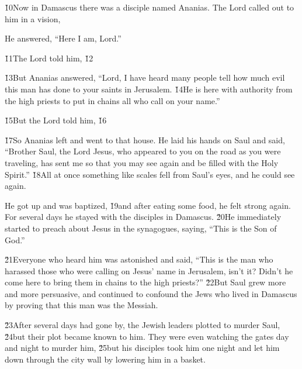 \v{10}Now in Damascus there was a disciple named Ananias. The Lord called out to him in a vision, 

He answered, ``Here I am, Lord.''

\v{11}The Lord told him,  \v{12}

\v{13}But Ananias answered, ``Lord, I have heard many people tell how much evil this man has done to your saints in Jerusalem. \v{14}He is here with authority from the high priests to put in chains all who call on your name.''

\v{15}But the Lord told him,  \v{16}

\v{17}So Ananias left and went to that house. He laid his hands on Saul and said, ``Brother Saul, the Lord Jesus, who appeared to you on the road as you were traveling, has sent me so that you may see again and be filled with the Holy Spirit.'' \v{18}All at once something like scales fell from Saul's eyes, and he could see again.

He got up and was baptized, \v{19}and after eating some food, he felt strong again. For several days he stayed with the disciples in Damascus. \v{20}He immediately started to preach about Jesus in the synagogues, saying, ``This is the Son of God.''

\v{21}Everyone who heard him was astonished and said, ``This is the man who harassed those who were calling on Jesus' name in Jerusalem, isn't it? Didn't he come here to bring them in chains to the high priests?'' \v{22}But Saul grew more and more persuasive, and continued to confound the Jews who lived in Damascus by proving that this man was the Messiah.

\v{23}After several days had gone by, the Jewish leaders plotted to murder Saul, \v{24}but their plot became known to him. They were even watching the gates day and night to murder him, \v{25}but his disciples took him one night and let him down through the city wall by lowering him in a basket.

